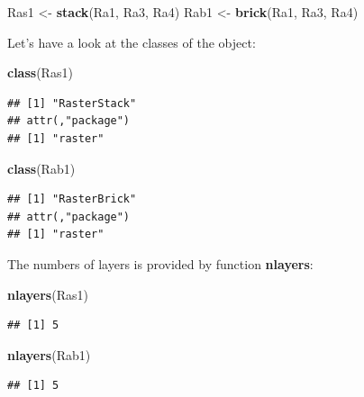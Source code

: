 \documentclass[]{report}
\newenvironment{Shaded}{\begin{snugshade}}{\end{snugshade}}
\newcommand{\KeywordTok}[1]{\textcolor[rgb]{0.13,0.29,0.53}{\textbf{#1}}}
\newcommand{\NormalTok}[1]{#1}
\newcommand{\StringTok}[1]{\textcolor[rgb]{0.31,0.60,0.02}{#1}}
\begin{document}
\begin{Shaded}
\begin{Highlighting}[]
\NormalTok{Ras1 <-}\StringTok{ }\KeywordTok{stack}\NormalTok{(Ra1, Ra3, Ra4)}
\NormalTok{Rab1 <-}\StringTok{ }\KeywordTok{brick}\NormalTok{(Ra1, Ra3, Ra4)}
\end{Highlighting}
\end{Shaded}

Let's have a look at the classes of the object:

\begin{Shaded}
\begin{Highlighting}[]
\KeywordTok{class}\NormalTok{(Ras1)}
\end{Highlighting}
\end{Shaded}

\begin{verbatim}
## [1] "RasterStack"
## attr(,"package")
## [1] "raster"
\end{verbatim}

\begin{Shaded}
\begin{Highlighting}[]
\KeywordTok{class}\NormalTok{(Rab1)}
\end{Highlighting}
\end{Shaded}

\begin{verbatim}
## [1] "RasterBrick"
## attr(,"package")
## [1] "raster"
\end{verbatim}

The numbers of layers is provided by function \textbf{nlayers}:

\begin{Shaded}
\begin{Highlighting}[]
\KeywordTok{nlayers}\NormalTok{(Ras1)}
\end{Highlighting}
\end{Shaded}

\begin{verbatim}
## [1] 5
\end{verbatim}

\begin{Shaded}
\begin{Highlighting}[]
\KeywordTok{nlayers}\NormalTok{(Rab1)}
\end{Highlighting}
\end{Shaded}

\begin{verbatim}
## [1] 5
\end{verbatim}
\end{document}

